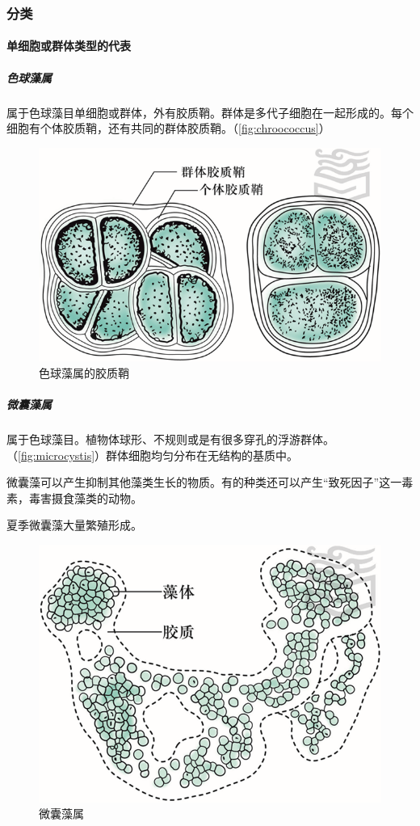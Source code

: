 \subsubsection{分类}

\paragraph{单细胞或群体类型的代表}

\subparagraph{色球藻属}

属于色球藻目单细胞或群体，外有胶质鞘。群体是多代子细胞在一起形成的。每个细胞有个体胶质鞘，还有共同的群体胶质鞘。（\autoref{fig:chroococcus}）

\begin{figure}[htbp]
	\centering
	\includegraphics[width=0.5\linewidth]{Pics/色球藻属的胶质鞘}
	\caption{色球藻属的胶质鞘}
	\label{fig:chroococcus}
\end{figure}

\subparagraph{微囊藻属}

属于色球藻目。植物体球形、不规则或是有很多穿孔的浮游群体。（\autoref{fig:microcystis}）群体细胞均匀分布在无结构的基质中。

微囊藻可以产生抑制其他藻类生长的物质。有的种类还可以产生“致死因子”这一毒素，毒害摄食藻类的动物。

夏季微囊藻大量繁殖形成。

\begin{figure}[htbp]
	\centering
	\includegraphics[width=0.6\linewidth]{Pics/微囊藻属}
	\caption{微囊藻属}
	\label{fig:microcystis}
\end{figure}

